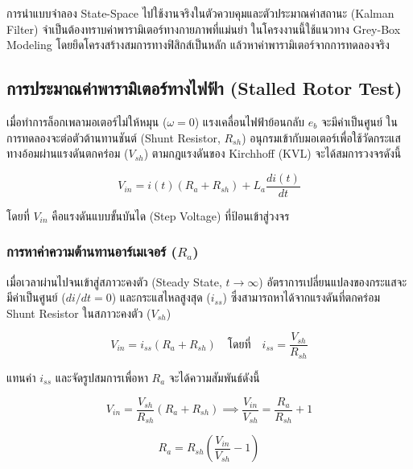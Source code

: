 การนำแบบจำลอง State-Space ไปใช้งานจริงในตัวควบคุมและตัวประมาณค่าสถานะ (Kalman Filter) จำเป็นต้องทราบค่าพารามิเตอร์ทางกายภาพที่แม่นยำ ในโครงงานนี้ใช้แนวทาง Grey-Box Modeling โดยยึดโครงสร้างสมการทางฟิสิกส์เป็นหลัก แล้วหาค่าพารามิเตอร์จากการทดลองจริง

\subsection{การประมาณค่าพารามิเตอร์ทางไฟฟ้า (Stalled Rotor Test)}

เมื่อทำการล็อกเพลามอเตอร์ไม่ให้หมุน ($\omega = 0$) แรงเคลื่อนไฟฟ้าย้อนกลับ $e_b$ จะมีค่าเป็นศูนย์ 
ในการทดลองจะต่อตัวต้านทานชันต์ (Shunt Resistor, $R_{sh}$) อนุกรมเข้ากับมอเตอร์เพื่อใช้วัดกระแสทางอ้อมผ่านแรงดันตกคร่อม ($V_{sh}$) 
ตามกฎแรงดันของ Kirchhoff (KVL) จะได้สมการวงจรดังนี้

\begin{equation}
    V_{in} = i(t)\left(R_a + R_{sh}\right) + L_a \frac{di(t)}{dt}
    \label{eq:kvl_shunt}
\end{equation}

\noindent โดยที่ $V_{in}$ คือแรงดันแบบขั้นบันได (Step Voltage) ที่ป้อนเข้าสู่วงจร

\subsubsection{การหาค่าความต้านทานอาร์เมเจอร์ ($R_a$)}
เมื่อเวลาผ่านไปจนเข้าสู่สภาวะคงตัว (Steady State, $t \to \infty$) อัตราการเปลี่ยนแปลงของกระแสจะมีค่าเป็นศูนย์ ($di/dt = 0$) และกระแสไหลสูงสุด ($i_{ss}$) ซึ่งสามารถหาได้จากแรงดันที่ตกคร่อม Shunt Resistor ในสภาวะคงตัว ($V_{sh}$)

\begin{equation}
    V_{in} = i_{ss}\left(R_a + R_{sh}\right) \quad \text{โดยที่} \quad i_{ss} = \frac{V_{sh}}{R_{sh}}
\end{equation}

\noindent แทนค่า $i_{ss}$ และจัดรูปสมการเพื่อหา $R_a$ จะได้ความสัมพันธ์ดังนี้

\begin{equation}
    V_{in} = \frac{V_{sh}}{R_{sh}}\left(R_a + R_{sh}\right) \implies \frac{V_{in}}{V_{sh}} = \frac{R_a}{R_{sh}} + 1
\end{equation}

\begin{equation}
    R_a = R_{sh} \left( \frac{V_{in}}{V_{sh}} - 1 \right)
    \label{eq:calc_Ra}
\end{equation}

